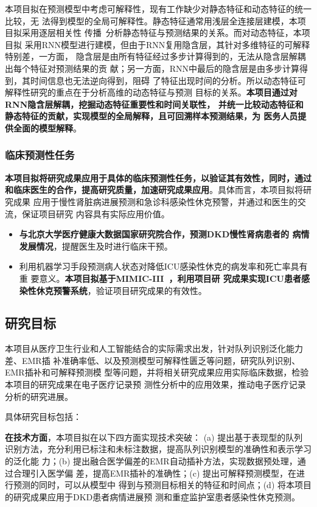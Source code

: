 本项目拟在预测模型中考虑可解释性，现有工作缺少对静态特征和动态特征的统一比较，无
法得到模型的全局可解释性。静态特征通常用浅层全连接层建模，本项目拟采用逐层相关性
传播~分析静态特征与预测结果的关系。而对动态特征，本项目拟
采用RNN模型进行建模，但由于RNN复用隐含层，其针对多维特征的可解释特别差，一方面，
隐含层是由所有特征经过多步计算得到的，无法从隐含层解耦出每个特征对预测结果的贡
献；另一方面，RNN中最后的隐含层是由多步计算得到，其时间信息也无法逆向得到，阻碍
了特征出现时间的分析。所以动态特征可解释性研究的重点在于分析高维的动态特征与预测
目标的关系。\textbf{本项目通过对RNN隐含层解耦，挖掘动态特征重要性和时间关联性，
并统一比较动态特征和静态特征的贡献，实现模型的全局解释，且可回溯样本预测结果，为
医务人员提供全面的模型解释}。

\subsubsection{临床预测性任务}

\textbf{本项目拟将研究成果应用于具体的临床预测性任务，以验证其有效性，同时，通过
和临床医生的合作，提高研究质量，加速研究成果应用}。具体而言，本项目拟将研究成果
应用于慢性肾脏病进展预测和急诊科感染性休克预警，并通过和医生的交流，保证项目研究
内容具有实际应用价值。

\begin{itemize}
    \item  \textbf{与北京大学医疗健康大数据国家研究院合作，预测DKD慢性肾病患者的
    病情发展情况}，提醒医生及时进行临床干预。
    \item  利用机器学习手段预测病人状态对降低ICU感染性休克的病发率和死亡率具有重
    要意义。\textbf{本项目拟基于MIMIC-III~，利用项目研
    究成果实现ICU患者感染性休克预警系统}，验证项目研究成果的有效性。
\end{itemize}


\subsection{研究目标}\label{ch2target}

本项目从医疗卫生行业和人工智能结合的实际需求出发，针对队列识别泛化能力差、EMR插
补准确率低、以及预测模型可解释性匮乏等问题，研究队列识别、EMR插补和可解释预测模
型等问题，并将相关研究成果应用实际临床数据，检验本项目的研究成果在电子医疗记录预
测性分析中的应用效果，推动电子医疗记录分析的研究进展。

具体研究目标包括：

\textbf{在技术方面}，本项目拟在以下四方面实现技术突破： (a) 提出基于表现型的队列
识别方法，充分利用已标注和未标注数据，提高队列识别模型的准确性和表示学习的泛化能
力；(b) 提出融合医学偏差的EMR自动插补方法，实现数据预处理，通过合理引入医学偏
差，提高EMR插补的准确性；(c) 提出可解释预测模型，在进行预测的同时，可以从模型中
得到与预测目标相关的特征和时间点；(d) 将本项目的研究成果应用于DKD患者病情进展预
测和重症监护室患者感染性休克预测。


